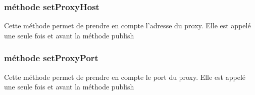 \documentclass[a4paper , 12pt]{article}
\begin{document}
  \subsubsection*{méthode setProxyHost}
  Cette méthode permet de prendre en compte l'adresse du proxy. Elle est appelé une seule fois et avant la méthode publish
  \subsubsection*{méthode setProxyPort}
  Cette méthode permet de prendre en compte le port du proxy. Elle est appelé une seule fois et avant la méthode publish
\end{document}
